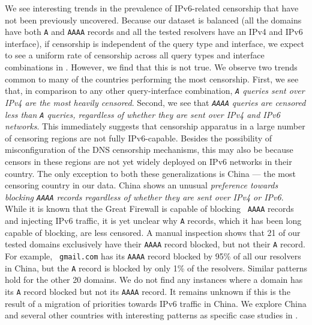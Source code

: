 We see interesting trends in the prevalence of IPv6-related censorship that
have not been previously uncovered.
%
Because our dataset is balanced (\ie all the domains have both {\tt A} and
{\tt AAAA} records and all the tested resolvers have an IPv4 and IPv6
interface), if censorship is independent of the query type and interface, we
expect to see a uniform rate of censorship across all query types and interface
combinations in . 
%
However, we find that this is not true. We observe two trends common to many of
the countries performing the most censorship. 
%
First, we see that, in comparison to any other query-interface combination,
{\em {\tt A} queries sent over IPv4 are the most heavily censored}. Second, we
see that {\em{\tt AAAA} queries are censored less than {\tt A} queries,
regardless of whether they are sent over IPv4 and IPv6 networks}.
%
This immediately suggests that censorship apparatus in a large number of
censoring regions are not fully IPv6-capable. Besides the possibility of
misconfiguration of the DNS censorship mechanisms, this may also be because
censors in these regions are not yet widely deployed on IPv6 networks in their
country.
%
The only exception to both these generalizations is China --- the most
censoring country in our data. China shows an unusual {\em preference towards
blocking {\tt AAAA} records regardless of whether they are sent over IPv4 or
IPv6}. While it is known that the Great Firewall is capable of blocking {\tt
AAAA} records and injecting IPv6 traffic, it is yet unclear why {\tt A}
records, which it has been long capable of blocking, are less censored.
A manual inspection shows that 21 of our tested domains exclusively have their
{\tt AAAA} record blocked, but not their {\tt A} record. For example, {\tt
gmail.com} has its {\tt AAAA} record blocked by 95\% of all our resolvers in
China, but the {\tt A} record is blocked by only 1\% of the resolvers. Similar
patterns hold for the other 20 domains. We do not find any instances where
a domain has its {\tt A} record blocked but not its {\tt AAAA} record. 
%
It remains unknown if this is the result of a migration of priorities towards
IPv6 traffic in China. We explore China and several other countries with
interesting patterns as specific case studies in .

